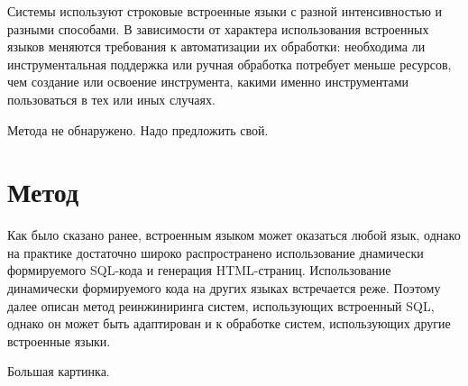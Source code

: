 Системы используют строковые встроенные языки с разной интенсивностью и разными способами. В зависимости от характера использования встроенных языков меняются требования к автоматизации их обработки: необходима ли инструментальная поддержка или ручная обработка потребует меньше ресурсов, чем создание или освоение инструмента, какими именно инструментами пользоваться в тех или иных случаях.

Метода не обнаружено. Надо предложить свой.


\section{Метод}

Как было сказано ранее, встроенным языком может оказаться любой язык, однако на практике достаточно широко распространено использование днамически формируемого SQL-кода и генерация HTML-страниц. Использование динамически формируемого кода на других языках встречается реже. Поэтому далее описан метод реинжиниринга систем, использующих встроенный SQL, однако он может быть адаптирован и к обработке систем, использующих другие встроенные языки.

Большая картинка.

